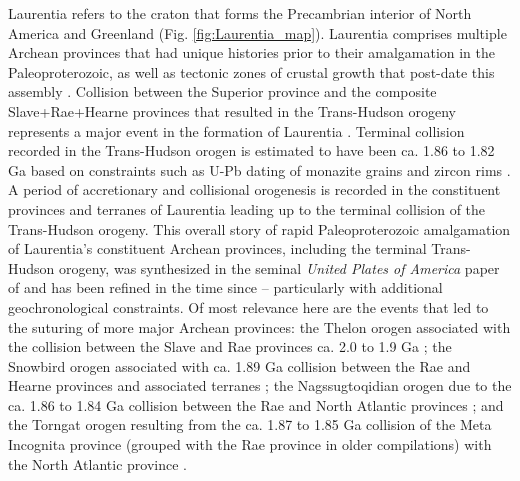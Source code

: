 \documentclass[11pt,letterpaper]{article}
\begin{document}
Laurentia refers to the craton that forms the Precambrian interior of North America and Greenland (Fig. \ref{fig:Laurentia_map}). Laurentia comprises multiple Archean provinces that had unique histories prior to their amalgamation in the Paleoproterozoic, as well as tectonic zones of crustal growth that post-date this assembly \citep{Hoffman1989a, Whitmeyer2007a}. Collision between the Superior province and the composite Slave+Rae+Hearne provinces that resulted in the Trans-Hudson orogeny represents a major event in the formation of Laurentia \citep{Corrigan2009a}. Terminal collision recorded in the Trans-Hudson orogen is estimated to have been ca. 1.86 to 1.82 Ga based on constraints such as U-Pb dating of monazite grains and zircon rims \citep[e.g.]{Skipton2016a, Weller2017a}. A period of accretionary and collisional orogenesis is recorded in the constituent provinces and terranes of Laurentia leading up to the terminal collision of the Trans-Hudson orogeny. This overall story of rapid Paleoproterozoic amalgamation of Laurentia's constituent Archean provinces, including the terminal Trans-Hudson orogeny, was synthesized in the seminal \textit{United Plates of America} paper of \citet{Hoffman1988a} and has been refined in the time since -- particularly with additional geochronological constraints. Of most relevance here are the events that led to the suturing of more major Archean provinces: the Thelon orogen associated with the collision between the Slave and Rae provinces ca. 2.0 to 1.9 Ga \citep{Hoffman1989a}; the Snowbird orogen associated with ca. 1.89 Ga collision between the Rae and Hearne provinces and associated terranes \citep{Berman2007a}; the Nagssugtoqidian orogen due to the ca. 1.86 to 1.84 Ga collision between the Rae and North Atlantic provinces \citep{St-Onge2009a}; and the Torngat orogen resulting from the ca. 1.87 to 1.85 Ga collision of the Meta Incognita province (grouped with the Rae province in older compilations) with the North Atlantic province \citep{St-Onge2009a}. 
\end{document}
